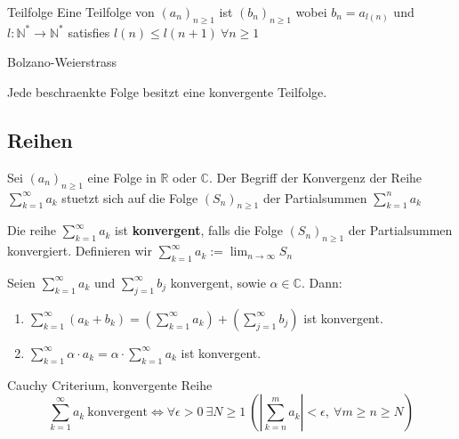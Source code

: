 \documentclass[8pt,a4paper,twocolumn]{extarticle}
\newcommand{\N}{\mathbb{N}}
\newcommand{\R}{\mathbb{R}}
\newcommand{\seq}[1]{\left( #1_n \right)_{n \ge 1}}
\begin{document}
\begin{definition}{2.27}
    \par Teilfolge
    Eine Teilfolge von $\seq{a}$ ist $\seq{b}$ wobei $b_n = a_{l(n)}$ und $l: \N^* \to \N^*$ satisfies $l(n) \le l(n + 1)\ \forall n \ge 1$
\end{definition}

\begin{satz}{2.29}
    \label{satz:bolzano-weierstrass}
    \par Bolzano-Weierstrass

    Jede beschraenkte Folge besitzt eine konvergente Teilfolge.
\end{satz}

\subsection{Reihen}
Sei $\seq{a}$ eine Folge in $\R$ oder $\mathbb{C}$. Der Begriff der Konvergenz der Reihe $\sum_{k = 1}^{\infty} a_k$ stuetzt sich auf die
Folge $\seq{S}$ der Partialsummen $\sum_{k = 1}^n a_k$

\begin{definition}{2.37}
    Die reihe $\sum_{k = 1}^{\infty} a_k$ ist \textbf{konvergent}, falls die Folge $\seq{S}$ der Partialsummen konvergiert.
    Definieren wir $\sum_{k = 1}^{\infty} a_k := \lim_{n \to \infty} S_n$
\end{definition}

\begin{satz}{2.40}
    Seien $\sum_{k=1}^{\infty} a_k$ und $\sum_{j=1}^{\infty} b_j$ konvergent, sowie $\alpha \in \mathbb{C}$.
    Dann:
    \begin{enumerate}
        \item $\sum_{k=1}^{\infty} (a_k + b_k) = \left( \sum_{k=1}^{\infty} a_k \right) + \left( \sum_{j=1}^{\infty} b_j \right)$ ist konvergent.
        \item $\sum_{k=1}^{\infty} \alpha \cdot a_k = \alpha \cdot \sum_{k=1}^{\infty} a_k$ ist konvergent.
    \end{enumerate}
\end{satz}

\begin{satz}{2.41}
    \label{satz:cauchy-criterium-reihe}
    \par Cauchy Criterium, konvergente Reihe
    \[
        \sum_{k=1}^\infty a_k\ \mbox{konvergent}
        \Leftrightarrow
        \forall \epsilon > 0\ \exists N \ge 1\ \left( \left| \sum_{k=n}^m a_k \right| < \epsilon,\ \forall m \ge n \ge N \right)
    \]
\end{satz}
\end{document}
